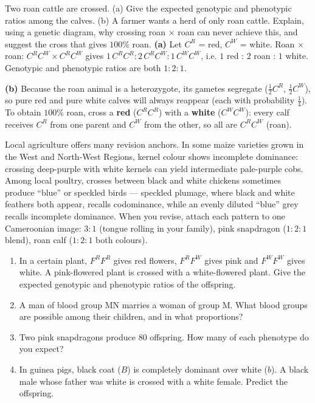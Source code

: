 \documentclass[11pt]{article}
\begin{document}
\begin{exoresolu}
Two roan cattle are crossed. (a) Give the expected genotypic and phenotypic ratios among the calves. (b) A farmer wants a herd of only roan cattle. Explain, using a genetic diagram, why crossing roan $\times$ roan can never achieve this, and suggest the cross that gives $100\%$ roan.
\tcblower
\textbf{(a)} Let $C^R$ = red, $C^W$ = white. Roan $\times$ roan: $C^R C^W \times C^R C^W$ gives $1\,C^R C^R : 2\,C^R C^W : 1\,C^W C^W$, i.e. $1$ red : $2$ roan : $1$ white. Genotypic and phenotypic ratios are both $1:2:1$.

\textbf{(b)} Because the roan animal is a heterozygote, its gametes segregate ($\tfrac{1}{2}C^R$, $\tfrac{1}{2}C^W$), so pure red and pure white calves will always reappear (each with probability $\tfrac{1}{4}$). To obtain $100\%$ roan, cross a \textbf{red} ($C^R C^R$) with a \textbf{white} ($C^W C^W$): every calf receives $C^R$ from one parent and $C^W$ from the other, so all are $C^R C^W$ (roan).
\end{exoresolu}

\begin{savaistu}
Local agriculture offers many revision anchors. In some maize varieties grown in the West and North-West Regions, kernel colour shows incomplete dominance: crossing deep-purple with white kernels can yield intermediate pale-purple cobs. Among local poultry, crosses between black and white chickens sometimes produce ``blue'' or speckled birds --- speckled plumage, where black and white feathers both appear, recalls codominance, while an evenly diluted ``blue'' grey recalls incomplete dominance. When you revise, attach each pattern to one Cameroonian image: $3:1$ (tongue rolling in your family), pink snapdragon ($1:2:1$ blend), roan calf ($1:2:1$ both colours).
\end{savaistu}

\begin{exercice}[Practice]
\begin{enumerate}
\item In a certain plant, $F^R F^R$ gives red flowers, $F^R F^W$ gives pink and $F^W F^W$ gives white. A pink-flowered plant is crossed with a white-flowered plant. Give the expected genotypic and phenotypic ratios of the offspring.
\item A man of blood group MN marries a woman of group M. What blood groups are possible among their children, and in what proportions?
\item Two pink snapdragons produce 80 offspring. How many of each phenotype do you expect?
\item In guinea pigs, black coat ($B$) is completely dominant over white ($b$). A black male whose father was white is crossed with a white female. Predict the offspring.
\end{enumerate}
\end{exercice}
\end{document}
